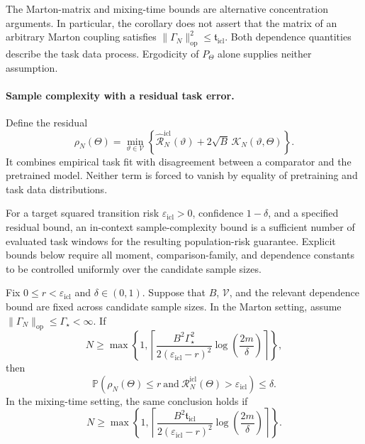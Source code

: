 The Marton-matrix and mixing-time bounds are alternative concentration arguments. In particular, the corollary does not assert that the matrix of an arbitrary Marton coupling satisfies \(\|\Gamma_N\|_{\mathrm{op}}^2\leqslant\mathfrak t_{\mathrm{icl}}\). Both dependence quantities describe the task data process. Ergodicity of \(P_\Theta\) alone supplies neither assumption.

\paragraph{Sample complexity with a residual task error.}

Define the residual
\begin{equation}
\label{eq:ICL residual}
\rho_N(\Theta)=\min_{\vartheta\in\mathcal V}
\left\{\widehat{\mathcal R}_N^{\mathrm{icl}}(\vartheta)
+2\sqrt B\,\mathcal K_N(\vartheta,\Theta)\right\}.
\end{equation}
It combines empirical task fit with disagreement between a comparator and the pretrained model. Neither term is forced to vanish by equality of pretraining and task data distributions.

\begin{definition}
\label{def:ICL sample complexity}
For a target squared transition risk \(\varepsilon_{\mathrm{icl}}>0\), confidence \(1-\delta\), and a specified residual bound, an in-context sample-complexity bound is a sufficient number of evaluated task windows for the resulting population-risk guarantee. Explicit bounds below require all moment, comparison-family, and dependence constants to be controlled uniformly over the candidate sample sizes.
\end{definition}

\begin{proposition}
\label{prop:ICL Marton sample complexity}
Fix \(0\leqslant r<\varepsilon_{\mathrm{icl}}\) and \(\delta\in(0,1)\). Suppose that \(B\), \(\mathcal V\), and the relevant dependence bound are fixed across candidate sample sizes. In the Marton setting, assume \(\|\Gamma_N\|_{\mathrm{op}}\leqslant\Gamma_\star<\infty\). If
\begin{equation}
\label{eq:ICL Marton sample complexity}
N\geqslant\max\left\{1,
\left\lceil\frac{B^2\Gamma_\star^2}{2(\varepsilon_{\mathrm{icl}}-r)^2}
\log\left(\frac{2m}{\delta}\right)\right\rceil\right\},
\end{equation}
then
\begin{equation}
\label{eq:ICL residual failure event}
\mathbb P\left(\rho_N(\Theta)\leqslant r\ \text{and}\
\mathcal R_N^{\mathrm{icl}}(\Theta)>\varepsilon_{\mathrm{icl}}\right)\leqslant\delta.
\end{equation}
In the mixing-time setting, the same conclusion holds if
\begin{equation}
\label{eq:ICL TV sample complexity}
N\geqslant\max\left\{1,
\left\lceil\frac{B^2\mathfrak t_{\mathrm{icl}}}{2(\varepsilon_{\mathrm{icl}}-r)^2}
\log\left(\frac{2m}{\delta}\right)\right\rceil\right\}.
\end{equation}
\end{proposition}

